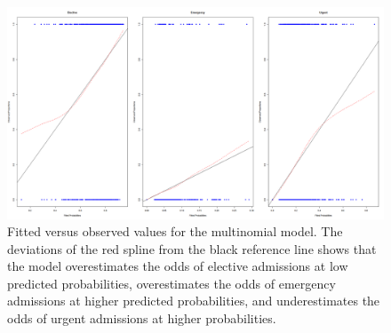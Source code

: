 \documentclass[11pt]{article}
\begin{document}
\begin{figure}[ht]
    \centering
    \includegraphics[width=\textwidth]{img/fitted_observed.png}
    \caption{Fitted versus observed values for the multinomial model. The deviations of the red spline from the black reference line shows that the model overestimates the odds of elective admissions at low predicted probabilities, overestimates the odds of emergency admissions at higher predicted probabilities, and underestimates the odds of urgent admissions at higher probabilities.}
    \label{fig:fitted_observed}
\end{figure}
\end{document}
